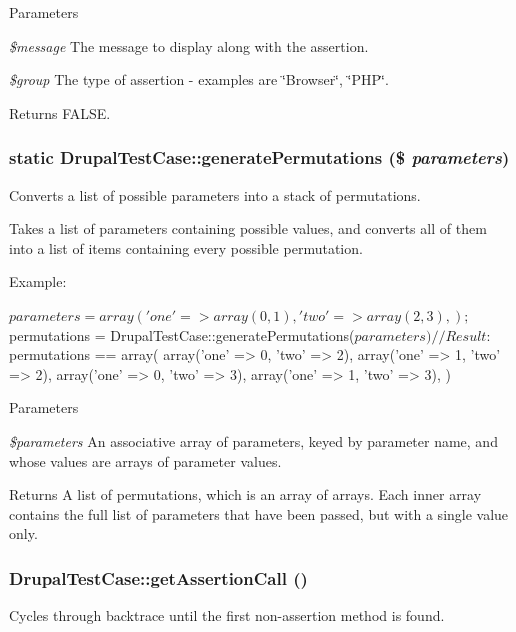 \begin{DoxyParams}{Parameters}
\item[{\em \$message}]The message to display along with the assertion. \item[{\em \$group}]The type of assertion -\/ examples are \char`\"{}Browser\char`\"{}, \char`\"{}PHP\char`\"{}. \end{DoxyParams}
\begin{DoxyReturn}{Returns}
FALSE. 
\end{DoxyReturn}
\hypertarget{classDrupalTestCase_a9d52ee8295c97dbb85abb2ab4f901e7e}{
\subsubsection[{generatePermutations}]{\setlength{\rightskip}{0pt plus 5cm}static DrupalTestCase::generatePermutations (\$ {\em parameters})}}
\label{classDrupalTestCase_a9d52ee8295c97dbb85abb2ab4f901e7e}
Converts a list of possible parameters into a stack of permutations.

Takes a list of parameters containing possible values, and converts all of them into a list of items containing every possible permutation.

Example: 
\begin{DoxyCode}
 $parameters = array(
   'one' => array(0, 1),
   'two' => array(2, 3),
 );
 $permutations = DrupalTestCase::generatePermutations($parameters)
 // Result:
 $permutations == array(
   array('one' => 0, 'two' => 2),
   array('one' => 1, 'two' => 2),
   array('one' => 0, 'two' => 3),
   array('one' => 1, 'two' => 3),
 )
\end{DoxyCode}



\begin{DoxyParams}{Parameters}
\item[{\em \$parameters}]An associative array of parameters, keyed by parameter name, and whose values are arrays of parameter values.\end{DoxyParams}
\begin{DoxyReturn}{Returns}
A list of permutations, which is an array of arrays. Each inner array contains the full list of parameters that have been passed, but with a single value only. 
\end{DoxyReturn}
\hypertarget{classDrupalTestCase_a6129193cb03df38244d6149bf88b7c0c}{
\subsubsection[{getAssertionCall}]{\setlength{\rightskip}{0pt plus 5cm}DrupalTestCase::getAssertionCall ()}}
\label{classDrupalTestCase_a6129193cb03df38244d6149bf88b7c0c}
Cycles through backtrace until the first non-\/assertion method is found.

